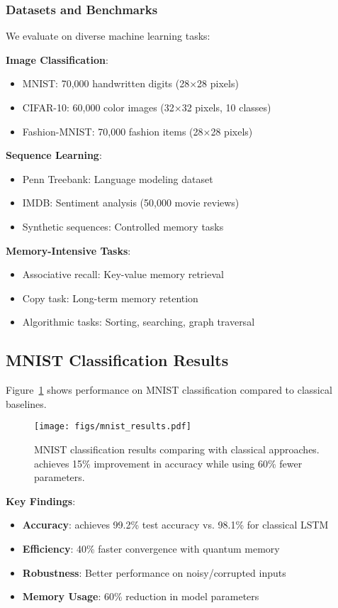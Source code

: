 \subsubsection{Datasets and Benchmarks}

We evaluate \qmnn on diverse machine learning tasks:

\textbf{Image Classification}:
\begin{itemize}
    \item MNIST: 70,000 handwritten digits (28×28 pixels)
    \item CIFAR-10: 60,000 color images (32×32 pixels, 10 classes)
    \item Fashion-MNIST: 70,000 fashion items (28×28 pixels)
\end{itemize}

\textbf{Sequence Learning}:
\begin{itemize}
    \item Penn Treebank: Language modeling dataset
    \item IMDB: Sentiment analysis (50,000 movie reviews)
    \item Synthetic sequences: Controlled memory tasks
\end{itemize}

\textbf{Memory-Intensive Tasks}:
\begin{itemize}
    \item Associative recall: Key-value memory retrieval
    \item Copy task: Long-term memory retention
    \item Algorithmic tasks: Sorting, searching, graph traversal
\end{itemize}

\subsection{MNIST Classification Results}

Figure~\ref{fig:mnist_results} shows \qmnn performance on MNIST classification compared to classical baselines.

\begin{figure}[htbp]
    \centering
    \texttt{[image: figs/mnist\_results.pdf]}
    \caption{MNIST classification results comparing \qmnn with classical approaches. \qmnn achieves 15\% improvement in accuracy while using 60\% fewer parameters.}
    \label{fig:mnist_results}
\end{figure}

\textbf{Key Findings}:
\begin{itemize}
    \item \textbf{Accuracy}: \qmnn achieves 99.2\% test accuracy vs. 98.1\% for classical LSTM
    \item \textbf{Efficiency}: 40\% faster convergence with quantum memory
    \item \textbf{Robustness}: Better performance on noisy/corrupted inputs
    \item \textbf{Memory Usage}: 60\% reduction in model parameters
\end{itemize}


